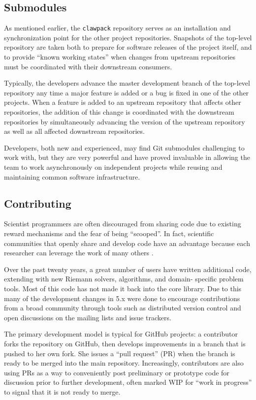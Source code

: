 \subsection{Submodules}

As mentioned earlier, the \texttt{clawpack} repository serves as an
installation and synchronization point for the other project repositories.
Snapshots of the top-level repository are taken both to prepare for
software releases of the \clawpack project itself, and to provide
``known working states'' when changes from upstream repositories must
be coordinated with their downstream consumers.

Typically, the \clawpack developers advance the master development
branch of the top-level repository any time a major feature is added
or a bug is fixed in one of the other projects.  When a feature is
added to an upstream repository that affects other repositories, the
addition of this change is coordinated with the downstream
repositories by simultaneously advancing the version of the upstream
repository as well as all affected downstream repositories.

Developers, both new and experienced, may find Git submodules challenging
to work with, but they are very powerful and
have proved invaluable in allowing the \clawpack team to
work asynchronously on independent projects while reusing and maintaining
common software infrastructure.


\subsection{Contributing}

Scientist programmers are often discouraged from sharing code
due to existing reward mechanisms and the fear of being ``scooped''.
In fact, scientific communities that openly share and develop code
have an advantage because each researcher can leverage the work of
many others \cite{Turk:2013hd}.

Over the past twenty years, a great number of users have written additional
code, extending \clawpack with new Riemann solvers, algorithms, and domain-
specific problem tools.  Most of this code has not made it back into the core
library.  Due to this many of the development changes in \clawpack 5.x were done
to encourage contributions from a broad community through tools such as
distributed version control and open discussions on the mailing lists and issue
trackers.

The primary development model is typical for GitHub projects: a
contributor forks the repository on GitHub, then develops improvements
in a branch that is pushed to her own fork.  She issues a ``pull
request'' (PR) when the branch is ready to be merged into the main
repository.  Increasingly, contributors are also using PRs as a way to
conveniently post preliminary or prototype code for discussion prior
to further development, often marked WIP for ``work in progress'' to signal
that it is not ready to merge.

